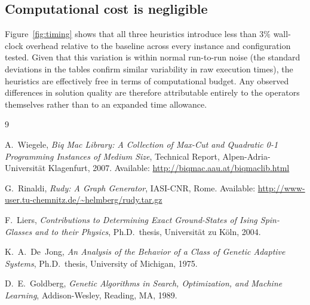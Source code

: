 \documentclass[12pt]{article}
\begin{document}
\subsection{Computational cost is negligible}

Figure~\ref{fig:timing} shows that all three heuristics introduce less than
$3\%$ wall-clock overhead relative to the baseline across every instance and
configuration tested.
Given that this variation is within normal run-to-run noise (the standard
deviations in the tables confirm similar variability in raw execution times),
the heuristics are effectively free in terms of computational budget.
Any observed differences in solution quality are therefore attributable
entirely to the operators themselves rather than to an expanded time allowance.

\begin{thebibliography}{9}

A.~Wiegele,
\textit{Biq Mac Library: A Collection of Max-Cut and Quadratic 0-1 Programming
Instances of Medium Size},
Technical Report, Alpen-Adria-Universit\"{a}t Klagenfurt, 2007.
Available: \url{http://biqmac.aau.at/biqmaclib.html}

G.~Rinaldi,
\textit{Rudy: A Graph Generator},
IASI-CNR, Rome.
Available: \url{http://www-user.tu-chemnitz.de/~helmberg/rudy.tar.gz}

F.~Liers,
\textit{Contributions to Determining Exact Ground-States of Ising Spin-Glasses
and to their Physics},
Ph.D.\ thesis, Universit\"{a}t zu K\"{o}ln, 2004.

K.~A.~De~Jong,
\textit{An Analysis of the Behavior of a Class of Genetic Adaptive Systems},
Ph.D.\ thesis, University of Michigan, 1975.

D.~E.~Goldberg,
\textit{Genetic Algorithms in Search, Optimization, and Machine Learning},
Addison-Wesley, Reading, MA, 1989.

\end{thebibliography}
\end{document}
